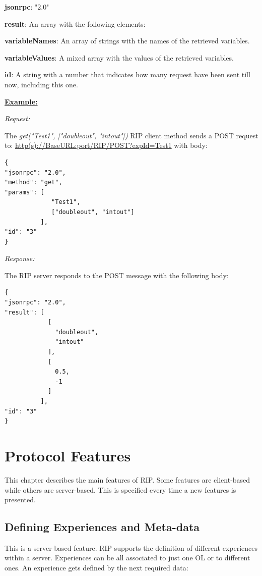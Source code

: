 \begin{myEnumerate}
    \item \textbf{jsonrpc}: "2.0"
    \item \textbf{result}: An array with the following elements:
    \begin{myEnumerate}
        \item \textbf{variableNames}: An array of strings with the names of the retrieved variables.
        \item \textbf{variableValues}: A mixed array with the values of the retrieved variables.
    \end{myEnumerate}
    \item \textbf{id}: A string with a number that indicates how many request have been sent till now, including this one.
\end{myEnumerate}

\textbf{\underline{Example:}}

\textit{Request:}

The \textit{get("Test1", ["doubleout", "intout"])} RIP client method sends a POST request to: \url{http(s)://BaseURL:port/RIP/POST?expId=Test1} with body:

\begin{lstlisting}
{
"jsonrpc": "2.0",
"method": "get",
"params": [
  	         "Test1",
  	         ["doubleout", "intout"]
          ],
"id": "3"
}
\end{lstlisting}

\textit{Response:}

The RIP server responds to the POST message with the following body:

\begin{lstlisting}
{
"jsonrpc": "2.0",
"result": [
            [
              "doubleout",
              "intout"
            ],
            [
              0.5,
              -1
            ]
          ],
"id": "3"
}
\end{lstlisting}


\chapter{Protocol Features}
\label{System Features}

This chapter describes the main features of RIP. Some features are client-based while others are server-based. This is specified every time a new features is presented.

\section{Defining Experiences and Meta-data}
This is a server-based feature. RIP supports the definition of different experiences within a server. Experiences can be all associated to just one OL or to different ones. An experience gets defined by the next required data:

